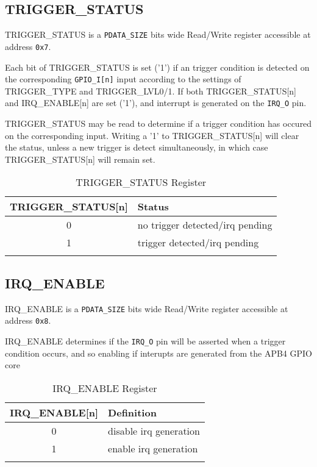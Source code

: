 \subsection{TRIGGER\_STATUS}\label{triggerstatus}

TRIGGER\_STATUS is a \texttt{PDATA\_SIZE} bits wide Read/Write register accessible at address \texttt{0x7}.

Each bit of TRIGGER\_STATUS is set ('1') if an trigger condition is detected on the corresponding \texttt{GPIO\_I[n]} input according to the settings of TRIGGER\_TYPE and TRIGGER\_LVL0/1. If both TRIGGER\_STATUS[n] and IRQ\_ENABLE[n] are set ('1'), and interrupt is generated on the \texttt{IRQ\_O} pin.

TRIGGER\_STATUS may be read to determine if a trigger condition has occured on the corresponding input. Writing a '1' to TRIGGER\_STATUS[n] will clear the status, unless a new trigger is detect simultaneously, in which case TRIGGER\_STATUS[n] will remain set.

\begin{longtable}[]{@{}cl@{}}
\toprule
\textbf{TRIGGER\_STATUS[n]} & \textbf{Status}\tabularnewline
\midrule
\endhead
0 & no trigger detected/irq pending\tabularnewline
1 & trigger detected/irq pending\tabularnewline
\bottomrule
\caption{TRIGGER\_STATUS Register}
\end{longtable}

\subsection{IRQ\_ENABLE}\label{irqenable}

IRQ\_ENABLE is a \texttt{PDATA\_SIZE} bits wide Read/Write register accessible at address \texttt{0x8}.

IRQ\_ENABLE determines if the \texttt{IRQ\_O} pin will be asserted when a trigger condition occurs, and so enabling if interupts are generated from the APB4 GPIO core

\begin{longtable}[]{@{}cl@{}}
\toprule
\textbf{IRQ\_ENABLE[n]} & \textbf{Definition}\tabularnewline
\midrule
\endhead
0 & disable irq generation\tabularnewline
1 & enable irq generation\tabularnewline
\bottomrule
\caption{IRQ\_ENABLE Register}
\end{longtable}
